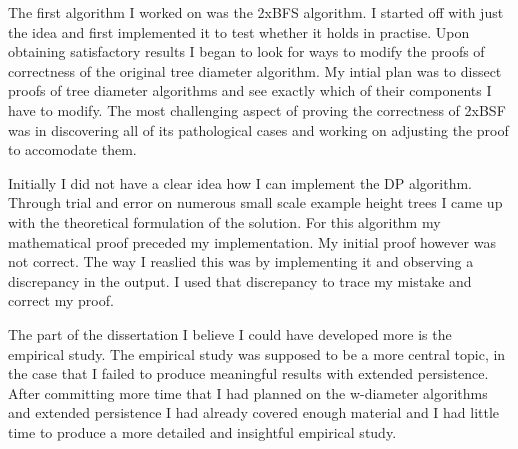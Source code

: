 The first algorithm I worked on was the 2xBFS algorithm. I started off with just the idea and first implemented it to test whether it holds in practise. Upon obtaining satisfactory results I began to look for ways to modify the proofs of correctness of the original tree diameter algorithm. My intial plan was to dissect proofs of tree diameter algorithms and see exactly which of their components I have to modify. The most challenging aspect of proving the correctness of 2xBSF was in discovering all of its pathological cases and working on adjusting the proof to accomodate them.

%


Initially I did not have a clear idea how I can implement the DP algorithm. Through trial and error on numerous small scale example height trees I came up with the theoretical formulation of the solution. For this algorithm my mathematical proof preceded my implementation. My initial proof however was not correct. The way I reaslied this was by implementing it and observing a discrepancy in the output. I used that discrepancy to trace my mistake and correct my proof.

The part of the dissertation I believe I could have developed more is the empirical study. The empirical study was supposed to be a more central topic, in the case that I failed to produce meaningful results with extended persistence. After committing more time that I had planned on the w-diameter algorithms and extended persistence I had already covered enough material and I had little time to produce a more detailed and insightful empirical study.


